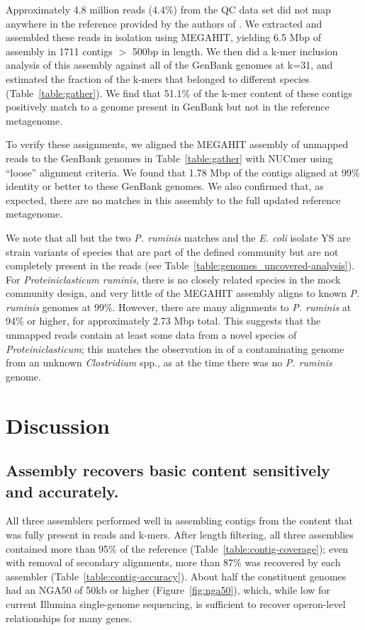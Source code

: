 \documentclass[11pt]{article}
\begin{document}
Approximately 4.8 million reads (4.4\%) from the QC data set did not
map anywhere in the reference provided by the authors of \cite{podar}.
We extracted and assembled these reads in isolation using MEGAHIT,
yielding 6.5 Mbp of assembly in 1711 contigs $>$ 500bp in length.  We
then did a k-mer inclusion analysis of this assembly against all of
the GenBank genomes at k=31, and estimated the fraction of the k-mers
that belonged to different species (Table~\ref{table:gather}). We find
that 51.1\% of the k-mer content of these contigs positively match to
a genome present in GenBank but not in the reference metagenome.

To verify these assignments, we aligned the MEGAHIT assembly of
unmapped reads to the GenBank genomes in Table~\ref{table:gather} with
NUCmer using ``loose'' alignment criteria. We found that 1.78 Mbp of
the contigs aligned at 99\% identity or better to these GenBank
genomes.  We also confirmed that, as expected, there are no matches in
this assembly to the full updated reference metagenome.

We note that all but the two {\em P. ruminis} matches and the {\em
  E. coli} isolate YS are strain variants of species that are part of
the defined community but are not completely present in the reads (see
Table~\ref{table:genomes_uncovered-analysis}).  For {\em
  Proteiniclasticum ruminis}, there is no closely related species in
the mock community design, and very little of the MEGAHIT assembly
aligns to known {\em P. ruminis} genomes at 99\%.  However, there are
many alignments to {\em P. ruminis} at 94\% or higher, for
approximately 2.73 Mbp total.  This suggests that the unmapped reads
contain at least some data from a novel species of {\em
  Proteiniclasticum}; this matches the observation in \cite{podar} of
a contaminating genome from an unknown {\em Clostridium} spp., as at the time
there was no {\em P. ruminis} genome.

\section*{Discussion}

\subsection*{Assembly recovers basic content sensitively and accurately.}

All three assemblers performed well in assembling contigs from the
content that was fully present in reads and k-mers.  After length filtering,
all three assemblies contained more than 95\% of the reference
(Table~\ref{table:contig-coverage}); even with removal of secondary
alignments, more than 87\% was recovered by each assembler
(Table~\ref{table:contig-accuracy}). About half the constituent genomes had
an NGA50 of 50kb or higher (Figure~\ref{fig:nga50}),
which, while low for current Illumina single-genome sequencing,
is sufficient to recover operon-level relationships for many genes.
\end{document}
